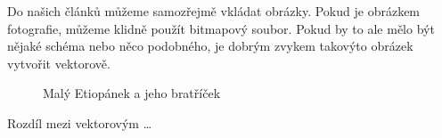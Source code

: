 \documentclass[a4paper, 11pt]{article}
\begin{document}
Do našich článků můžeme samozřejmě vkládat obrázky. Pokud je obrázkem fotografie,
můžeme klidně použít bitmapový soubor. Pokud by to ale mělo být nějaké schéma nebo
něco podobného, je dobrým zvykem takovýto obrázek vytvořit vektorově.
\setlength{\parskip}{0.1em}
\begin{figure}[h]
\centering
{}\hspace{0.24mm}
\medskip
\caption{Malý Etiopánek a jeho bratříček} \label{pic:1}
\medskip
\end{figure}

\newpage
Rozdíl mezi vektorovým \dots 

\begin{figure}[h]
\centering
{} 
\medsk
\end{figure}
\end{document}
